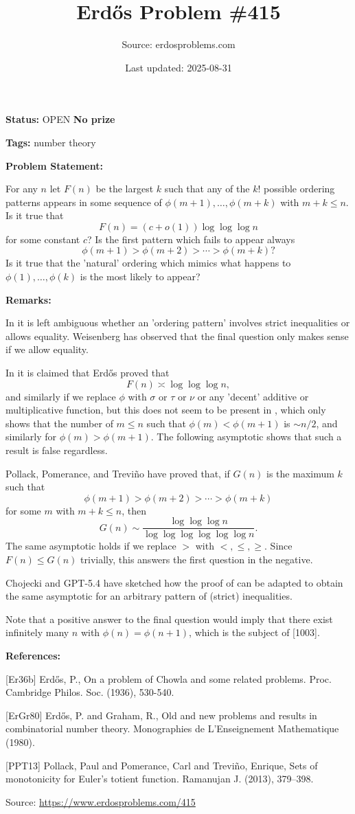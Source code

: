 \documentclass{article}
\title{Erd\H{o}s Problem \#415}
\date{Last updated: 2025-08-31}
\author{Source: erdosproblems.com}
\begin{document}
\maketitle

\noindent\textbf{Status:} OPEN \quad \textbf{No prize}

\noindent\textbf{Tags:} number theory

\medskip
\noindent\textbf{Problem Statement:}

For any $n$ let $F(n)$ be the largest $k$ such that any of the $k!$ possible ordering patterns appears in some sequence of $\phi(m+1),\ldots,\phi(m+k)$ with $m+k\leq n$. Is it true that\[F(n)=(c+o(1))\log\log\log n\]for some constant $c$? Is the first pattern which fails to appear always\[\phi(m+1)>\phi(m+2)>\cdots >\phi(m+k)?\]Is it true that the 'natural' ordering which mimics what happens to $\phi(1),\ldots,\phi(k)$ is the most likely to appear?

\bigskip
\noindent\textbf{Remarks:}

In \cite{ErGr80} it is left ambiguous whether an 'ordering pattern' involves strict inequalities or allows equality. Weisenberg has observed that the final question only makes sense if we allow equality. 

In \cite{ErGr80} it is claimed that Erd\H{o}s \cite{Er36b} proved that\[F(n)\asymp \log\log\log n,\]and similarly if we replace $\phi$ with $\sigma$ or $\tau$ or $\nu$ or any 'decent' additive or multiplicative function, but this does not seem to be present in \cite{Er36b}, which only shows that the number of $m\leq n$ such that $\phi(m)<\phi(m+1)$ is $\sim n/2$, and similarly for $\phi(m)>\phi(m+1)$. The following asymptotic shows that such a result is false regardless.

Pollack, Pomerance, and Trevi\~{n}o \cite{PPT13} have proved that, if $G(n)$ is the maximum $k$ such that\[\phi(m+1)> \phi(m+2)>\cdots > \phi(m+k)\]for some $m$ with $m+k\leq n$, then\[G(n)\sim \frac{\log\log\log n}{\log\log\log\log\log\log n}.\]The same asymptotic holds if we replace $>$ with $<,\leq,\geq$. Since $F(n)\leq G(n)$ trivially, this answers the first question in the negative.

Chojecki and GPT-5.4 have sketched how the proof of \cite{PPT13} can be adapted to obtain the same asymptotic for an arbitrary pattern of (strict) inequalities.

Note that a positive answer to the final question would imply that there exist infinitely many $n$ with $\phi(n)=\phi(n+1)$, which is the subject of [1003].

\bigskip
\noindent\textbf{References:}

[Er36b] Erd\H{o}s, P., On a problem of Chowla and some related problems. Proc. Cambridge Philos. Soc. (1936), 530-540.
 
 [ErGr80] Erd\H{o}s, P. and Graham, R., Old and new problems and results in combinatorial number theory. Monographies de L'Enseignement Mathematique (1980).
 
 [PPT13] Pollack, Paul and Pomerance, Carl and Trevi\~no, Enrique, Sets of monotonicity for {E}uler's totient function. Ramanujan J. (2013), 379--398.

\bigskip
\noindent\small{Source: \url{https://www.erdosproblems.com/415}}
\end{document}
